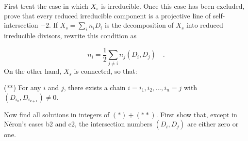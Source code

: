 First treat the case in which $X_s$ is irreducible.  Once this case has been
excluded, prove that every reduced irreducible component is a projective line of
self-intersection $-2$.  If $X_s=\sum_i n_iD_i$ is the decomposition of $X_s$
into reduced irreducible divisors, rewrite this condition as

\begin{equation}\tag{*}
n_i=\frac12\sum_{j\ne i}n_j(D_i,D_j) \quad .
\end{equation}
On the other hand, $X_s$ is connected, so that:

(**) For any $i$ and $j$, there exists a chain
$i=i_1,i_2,\ldots,i_n=j$ with
$(D_{i_k},D_{i_{k+1}})\ne0$.

Now find all solutions in integers of $(*)+(**)$.  First show that, except in
Néron's cases b2 and c2, the intersection numbers $(D_i,D_j)$ are either zero or
one.

